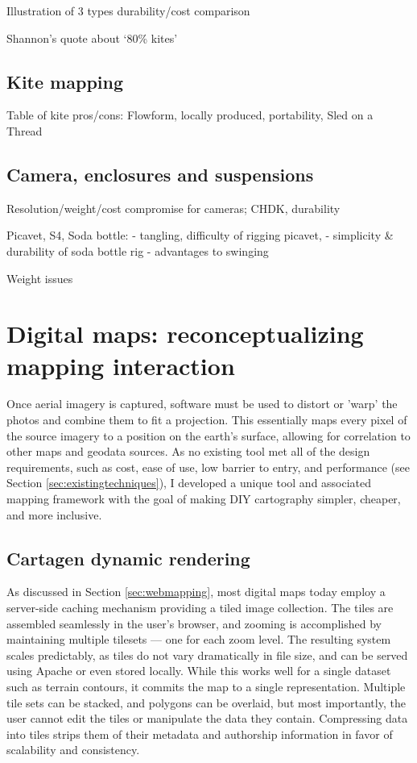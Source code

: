 \documentclass[11pt]{report}
\begin{document}
Illustration of 3 types durability/cost comparison

Shannon's quote about `80\% kites'

\subsection{Kite mapping}

Table of kite pros/cons: Flowform, locally produced, portability, Sled on a Thread

\subsection{Camera, enclosures and suspensions}
\label{subsec:cameraenclosures}
Resolution/weight/cost compromise for cameras; CHDK, durability

Picavet, S4, Soda bottle: 
- tangling, difficulty of rigging picavet, 
- simplicity \& durability of soda bottle rig
- advantages to swinging

Weight issues

\section{Digital maps: reconceptualizing mapping interaction}

Once aerial imagery is captured, software must be used to distort or 'warp' the photos and combine them to fit a projection. This essentially maps every pixel of the source imagery to a position on the earth's surface, allowing for correlation to other maps and geodata sources. As no existing tool met all of the design requirements, such as cost, ease of use, low barrier to entry, and performance (see Section \ref{sec:existingtechniques}), I developed a unique tool and associated mapping framework with the goal of making DIY cartography simpler, cheaper, and more inclusive.

\subsection{Cartagen dynamic rendering}

As discussed in Section \ref{sec:webmapping}, most digital maps today employ a server-side caching mechanism providing a tiled image collection. The tiles are assembled seamlessly in the user's browser, and zooming is accomplished by maintaining multiple tilesets --- one for each zoom level. The resulting system scales predictably, as tiles do not vary dramatically in file size, and can be served using Apache or even stored locally. While this works well for a single dataset such as terrain contours, it commits the map to a single representation. Multiple tile sets can be stacked, and polygons can be overlaid, but most importantly, the user cannot edit the tiles or manipulate the data they contain. Compressing data into tiles strips them of their metadata and authorship information in favor of scalability and consistency. 
\end{document}
